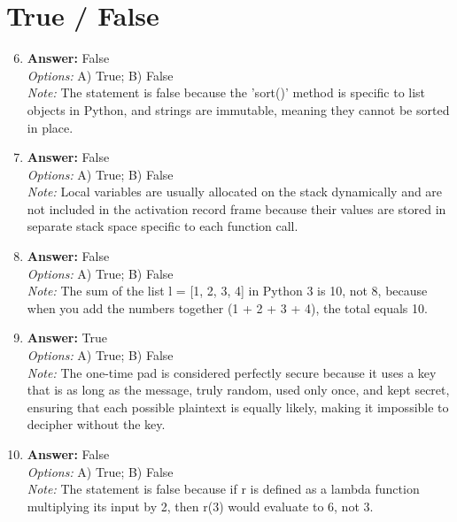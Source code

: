 \documentclass[12pt]{article}
\begin{document}
\section*{True / False}
\begin{enumerate}[label=\arabic*.]
\setcounter{enumi}{5}
\item \textbf{Answer:} False
\\ \textit{Options:} A) True; B) False
\\ \textit{Note:} The statement is false because the 'sort()' method is specific to list objects in Python, and strings are immutable, meaning they cannot be sorted in place.
\item \textbf{Answer:} False
\\ \textit{Options:} A) True; B) False
\\ \textit{Note:} Local variables are usually allocated on the stack dynamically and are not included in the activation record frame because their values are stored in separate stack space specific to each function call.
\item \textbf{Answer:} False
\\ \textit{Options:} A) True; B) False
\\ \textit{Note:} The sum of the list l = [1, 2, 3, 4] in Python 3 is 10, not 8, because when you add the numbers together (1 + 2 + 3 + 4), the total equals 10.
\item \textbf{Answer:} True
\\ \textit{Options:} A) True; B) False
\\ \textit{Note:} The one-time pad is considered perfectly secure because it uses a key that is as long as the message, truly random, used only once, and kept secret, ensuring that each possible plaintext is equally likely, making it impossible to decipher without the key.
\item \textbf{Answer:} False
\\ \textit{Options:} A) True; B) False
\\ \textit{Note:} The statement is false because if r is defined as a lambda function multiplying its input by 2, then r(3) would evaluate to 6, not 3.
\end{enumerate}
\end{document}
